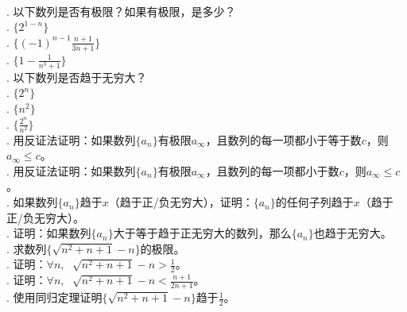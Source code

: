 \documentclass[12pt,UTF8]{ctexbook}
\begin{document}
\begin{xt}
    \mbox{} \\
    . 以下数列是否有极限？如果有极限，是多少？\\
    \indent{}. $\{2^{1-n}\}$ \\
    \indent{}. $\{(-1)^{n-1}\frac{n+1}{3n+1}\}$ \\
    \indent{}. $\{1 - \frac{1}{n^3+1}\}$ \\
    . 以下数列是否趋于无穷大？\\
    \indent{}. $\{2^{n}\}$ \\
    \indent{}. $\{n^2\}$ \\
    \indent{}. $\{\frac{2^n}{n^2}\}$\\
    . 用反证法证明：如果数列$\{a_n\}$有极限$a_\infty$，且数列的每一项都小于等于数$c$，则$a_\infty \leqslant c$。\\
    . 用反证法证明：如果数列$\{a_n\}$有极限$a_\infty$，且数列的每一项都小于数$c$，则$a_\infty \leqslant c$。\\
    . 如果数列$\{a_n\}$趋于$x$（趋于正/负无穷大），证明：$\{a_n\}$的任何子列趋于$x$（趋于正/负无穷大）。\\
    . 证明：如果数列$\{a_n\}$大于等于趋于正无穷大的数列，那么$\{a_n\}$也趋于无穷大。\\
    . 求数列$\{\sqrt{n^2 + n + 1} - n\}$的极限。\\
    . 证明：$\forall n,\;\,\, \sqrt{n^2 + n + 1} - n > \frac{1}{2}$。\\
    . 证明：$\forall n,\;\,\, \sqrt{n^2 + n + 1} - n < \frac{n + 1}{2n + 1}$。\\
    . 使用同归定理证明$\{\sqrt{n^2 + n + 1} - n\}$趋于$\frac{1}{2}$。
\end{xt}
\end{document}
